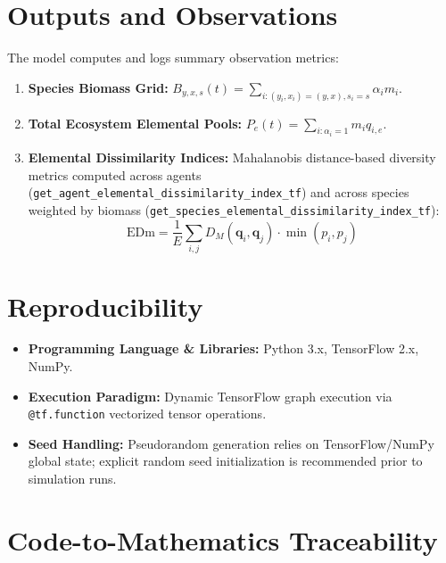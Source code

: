 \documentclass[11pt,a4paper]{article}
\begin{document}
\section{Outputs and Observations}
The model computes and logs summary observation metrics:
\begin{enumerate}
    \item \textbf{Species Biomass Grid:} $B_{y,x,s}(t) = \sum_{i: (y_i,x_i)=(y,x), s_i=s} \alpha_i m_i$.
    \item \textbf{Total Ecosystem Elemental Pools:} $P_e(t) = \sum_{i: \alpha_i=1} m_i q_{i, e}$.
    \item \textbf{Elemental Dissimilarity Indices:} Mahalanobis distance-based diversity metrics computed across agents (\texttt{get\_agent\_elemental\_dissimilarity\_index\_tf}) and across species weighted by biomass (\texttt{get\_species\_elemental\_dissimilarity\_index\_tf}):
    \begin{equation}
    \text{EDm} = \frac{1}{E} \sum_{i, j} D_M(\boldsymbol{q}_i, \boldsymbol{q}_j) \cdot \min(p_i, p_j)
    \end{equation}
\end{enumerate}

\section{Reproducibility}
\begin{itemize}
    \item \textbf{Programming Language \& Libraries:} Python 3.x, TensorFlow 2.x, NumPy.
    \item \textbf{Execution Paradigm:} Dynamic TensorFlow graph execution via \texttt{@tf.function} vectorized tensor operations.
    \item \textbf{Seed Handling:} Pseudorandom generation relies on TensorFlow/NumPy global state; explicit random seed initialization is recommended prior to simulation runs.
\end{itemize}

\section{Code-to-Mathematics Traceability}
\end{document}
